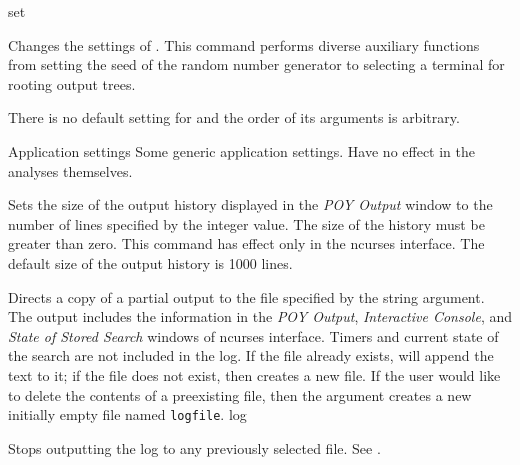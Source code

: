\begin{command}{set}{}


	\begin{poydescription}
            Changes the settings of \poy. This command performs diverse auxiliary 
            functions from setting the seed of the random number generator to
            selecting a terminal for rooting output trees.
            
            There is no default setting for  and the order of its
            arguments is arbitrary.
            
	\end{poydescription}

	\begin{arguments}

        \begin{argumentgroup}{Application settings}
            {Some generic application settings. Have no effect in the analyses
            themselves.}

                {Sets the size of the \poy output history displayed in the
                \emph{POY Output} window to the number of lines specified by the
                integer value. The size of the history must be greater than
                zero. This command has effect only in the ncurses interface. The
                default size of the output history is 1000 lines.}
                 {}

                {Directs a copy of a partial output to the file specified by the
                string  argument. The output includes the  information in the
                \emph{POY Output}, \emph{Interactive Console}, and \emph{State
                of Stored Search} windows of ncurses interface.  Timers and
                current state of the search are not included in the log. If the
                file already exists, \poy will append the text to it; if the
                file does not exist, then \poy creates a new file. If the user
                would like to delete the contents of a preexisting file, then
                the argument  creates a new
                initially empty file named \texttt{logfile}.}
                {log}

                {Stops outputting the log to any previously selected
                file. See .}
                {}


\end{argumentgroup}
\end{arguments}
\end{command}
